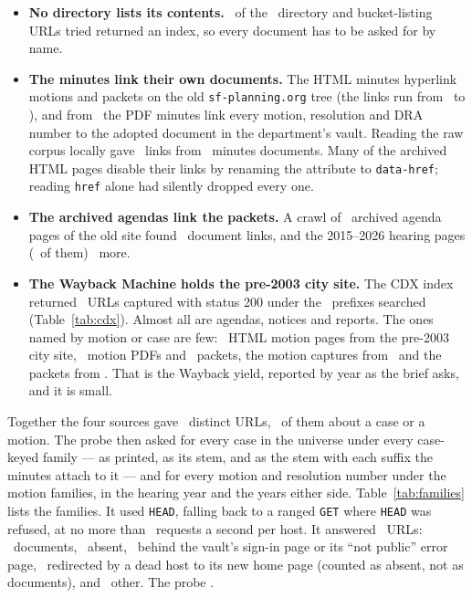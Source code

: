 \documentclass[11pt]{article}
\begin{document}
\begin{itemize}
\item \textbf{No directory lists its contents.} \ccListingsIndex\ of the \ccListingsTried\
directory and bucket-listing URLs tried returned an index, so every document has to be asked
for by name.
\item \textbf{The minutes link their own documents.} The HTML minutes hyperlink motions and
packets on the old \texttt{sf-planning.org} tree (the links run from \ccHtmlLinksFrom\ to
\ccHtmlLinksTo), and from \ccVaultLinksFrom\ the PDF minutes link every motion, resolution
and DRA number to the adopted document in the department's vault. Reading the raw corpus locally gave \ccMinutesLinks\ links from \ccMinutesLinkDocs\
minutes documents. Many of the archived HTML pages disable their links by renaming the
attribute to \texttt{data-href}; reading \texttt{href} alone had silently dropped every one.
\item \textbf{The archived agendas link the packets.} A crawl of \ccOldsitePages\ archived
agenda pages of the old site found \ccOldsiteLinks\ document links, and the 2015--2026 hearing
pages (\ccHearingPages\ of them) \ccHearingDocs\ more.
\item \textbf{The Wayback Machine holds the pre-2003 city site.} The CDX index returned
\ccCdxOk\ URLs captured with status 200 under the \ccCdxPrefixes\ prefixes searched
(Table~\ref{tab:cdx}). Almost all are agendas, notices and reports. The ones named by motion
or case are few: \ccCdxMotionsHtml\ HTML motion pages from the pre-2003 city site,
\ccCdxMotionsPdf\ motion PDFs and \ccCdxPackets\ packets, the motion captures from
\ccCdxFirstMotion\ and the packets from \ccCdxFirstPacket. That is the Wayback yield, reported
by year as the brief asks, and it is small.
\end{itemize}

Together the four sources gave \ccDiscoveredUrls\ distinct URLs, \ccDiscoveredCensus\ of them
about a case or a motion. The probe then asked for every case in the universe under every
case-keyed family --- as printed, as its stem, and as the stem with each suffix the minutes
attach to it --- and for every motion and resolution number under the motion families,
in the hearing year and the years either side. Table~\ref{tab:families} lists the families. It
used \texttt{HEAD}, falling back to a ranged \texttt{GET} where \texttt{HEAD} was refused, at
no more than \ccRatePerHost\ requests a second per host. It answered \ccProbed\ URLs: \ccProbeHits\
documents, \ccProbeMissing\ absent, \ccProbeLogin\ behind the vault's sign-in page or its
``not public'' error page, \ccProbeSoft\ redirected by a dead host to its new home page
(counted as absent, not as documents), and \ccProbeOther\ other.
The probe \ccProbeFinished.
\end{document}
